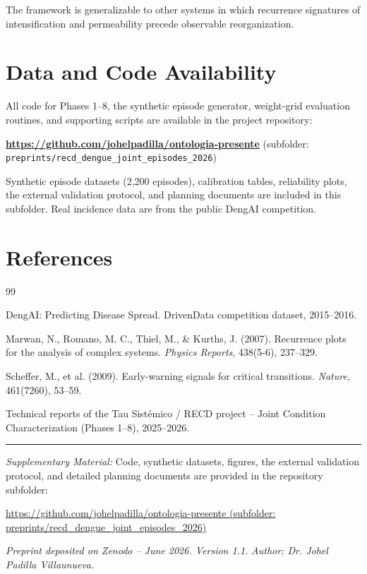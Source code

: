 \documentclass[11pt,a4paper]{article}
\begin{document}
The framework is generalizable to other systems in which recurrence signatures of intensification and permeability precede observable reorganization.

\section*{Data and Code Availability}

All code for Phases 1--8, the synthetic episode generator, weight-grid evaluation routines, and supporting scripts are available in the project repository:

\textbf{\url{https://github.com/johelpadilla/ontologia-presente}} (subfolder: \texttt{preprints/recd\_dengue\_joint\_episodes\_2026})

Synthetic episode datasets (2,200 episodes), calibration tables, reliability plots, the external validation protocol, and planning documents are included in this subfolder. Real incidence data are from the public DengAI competition.

\section*{References}
\begin{thebibliography}{99}

DengAI: Predicting Disease Spread. DrivenData competition dataset, 2015--2016.

Marwan, N., Romano, M. C., Thiel, M., \& Kurths, J. (2007). Recurrence plots for the analysis of complex systems. \textit{Physics Reports}, 438(5-6), 237--329.

Scheffer, M., et al. (2009). Early-warning signals for critical transitions. \textit{Nature}, 461(7260), 53--59.

Technical reports of the Tau Sistémico / RECD project – Joint Condition Characterization (Phases 1--8), 2025--2026.

\end{thebibliography}

\vspace{0.8em}
\hrule
\vspace{0.5em}
\noindent\textit{Supplementary Material:} Code, synthetic datasets, figures, the external validation protocol, and detailed planning documents are provided in the repository subfolder:

\vspace{0.2em}
\url{https://github.com/johelpadilla/ontologia-presente (subfolder: preprints/recd_dengue_joint_episodes_2026)}

\vspace{0.6em}
\noindent\textit{Preprint deposited on Zenodo – June 2026. Version 1.1.}  
\noindent\textit{Author: Dr. Johel Padilla Villaunueva.}
\end{document}
